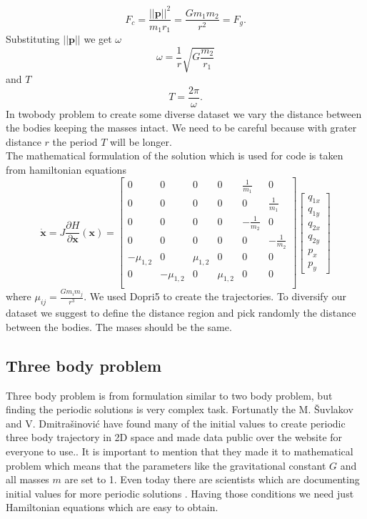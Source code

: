 \begin{equation}
	F_c = \frac{||\mathbf{p}||^2}{m_1r_1} = \frac{Gm_1m_2}{r^2} = F_g.
\end{equation}
Substituting $||\mathbf{p}||$ we get $\omega$
\begin{equation}
	\omega = \frac{1}{r}\sqrt{G\frac{m_2}{r_1}}
\end{equation} and $T$
 \begin{equation}
 	T = \frac{2\pi}{\omega}.
 \end{equation}
In twobody problem to create some diverse dataset we vary the distance between the bodies keeping the masses intact. We need to be careful because with grater distance $r$ the period $T$ will be longer.\\
The mathematical formulation of the solution which is used for code is taken from hamiltonian equations
\begin{equation}
	\dot{\mathbf{x}} = J\frac{\partial H}{\partial \mathbf{x}}(\mathbf{x})=
\begin{bmatrix}
	0 & 0 & 0 & 0 & \frac{1}{m_1} & 0\\
	0 & 0 & 0 & 0 & 0 & \frac{1}{m_1}\\
	0 & 0 & 0 & 0 & -\frac{1}{m_2} & 0\\
	0 & 0 & 0 & 0 & 0 & -\frac{1}{m_2}\\
	-\mu_{1,2} & 0 & \mu_{1,2} & 0 & 0 & 0 \\
	0 & -\mu_{1,2} & 0 & \mu_{1,2} & 0 & 0 \\
\end{bmatrix}
\begin{bmatrix}
	q_{1x}\\
	q_{1y}\\
	q_{2x}\\
	q_{2y}\\
	p_x\\
	p_y
\end{bmatrix} 
\end{equation} where $\mu_{ij}=\frac{Gm_im_j}{r^3}.$
We used Dopri5 to create the trajectories. To diversify our dataset we suggest to define the distance region and pick randomly the distance between the bodies. The mases should be the same.

\subsection{Three body problem}
Three body problem is from formulation similar to two body problem, but finding the periodic solutions is very complex task. Fortunatly the M. Šuvlakov and V. Dmitrašinović have found many of the initial values to create periodic three body trajectory in 2D space and made data public over the website for everyone to use.\cite{papthreebody}\cite{web}. It is important to mention that they made it to mathematical problem which means that the parameters like the gravitational constant $G$ and all masses $m$ are set to 1.
Even today there are scientists which are documenting initial values for more periodic solutions \cite{hudomal2015new}.
Having those conditions we need just Hamiltonian equations which are easy to obtain. 

